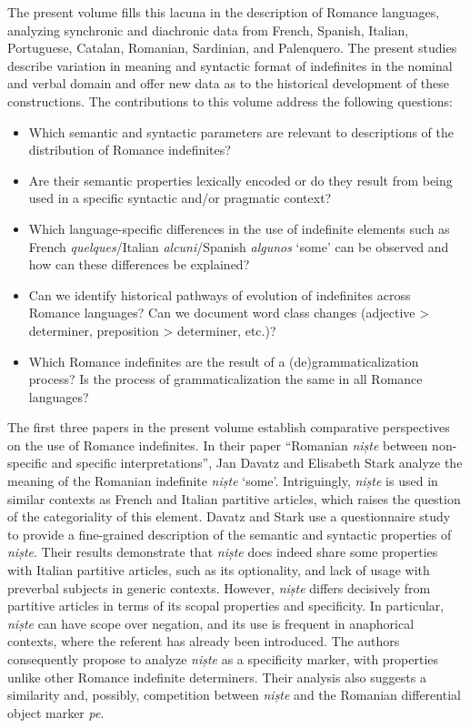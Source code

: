 \documentclass[output=paper,colorlinks,citecolor=brown]{langscibook}
\begin{document}
The present volume fills this lacuna in the description of Romance languages, analyzing synchronic and diachronic data from French, Spanish, Italian, Portuguese, Catalan, Romanian, Sardinian, and Palenquero. The present studies describe variation in meaning and syntactic format of indefinites in the nominal and verbal domain and offer new data as to the historical development of these constructions. The contributions to this volume address the following questions:

\begin{itemize}
\item Which semantic and syntactic parameters are relevant to descriptions of the distribution of Romance indefinites?
\item Are their semantic properties lexically encoded or do they result from being used in a specific syntactic and/or pragmatic context?  
\item Which language-specific differences in the use of indefinite elements such as French \textit{quelques}\slash Italian \textit{alcuni}\slash Spanish \textit{algunos} `some' can be observed and how can these differences be explained?
\item Can we identify historical pathways of evolution of indefinites across Romance languages? Can we document word class changes (adjective > determiner, preposition > determiner, etc.)? 
\item Which Romance indefinites are the result of a (de)grammaticalization process? Is the process of grammaticalization the same in all Romance languages? 
\end{itemize}

The first three papers in the present volume establish comparative perspectives on the use of Romance indefinites. In their paper “Romanian \textit{niște} between non-specific and specific interpretations”, Jan Davatz and Elisabeth Stark analyze the meaning of the Romanian indefinite \textit{niște} ‘some’. Intriguingly, \textit{niște} is used in similar contexts as French and Italian partitive articles, which raises the question of the categoriality of this element. Davatz and Stark use a questionnaire study to provide a fine-grained description of the semantic and syntactic properties of \textit{niște}. Their results demonstrate that \textit{niște} does indeed share some properties with Italian partitive articles, such as its optionality, and lack of usage with preverbal subjects in generic contexts. However, \textit{niște} differs decisively from partitive articles in terms of its scopal properties and specificity. In particular, \textit{niște} can have scope over negation, and its use is frequent in anaphorical contexts, where the referent has already been introduced. The authors consequently propose to analyze \textit{niște} as a specificity marker, with properties unlike other Romance indefinite determiners. Their analysis also suggests a similarity and, possibly, competition between \textit{niște} and the Romanian differential object marker \textit{pe}.
\end{document}
